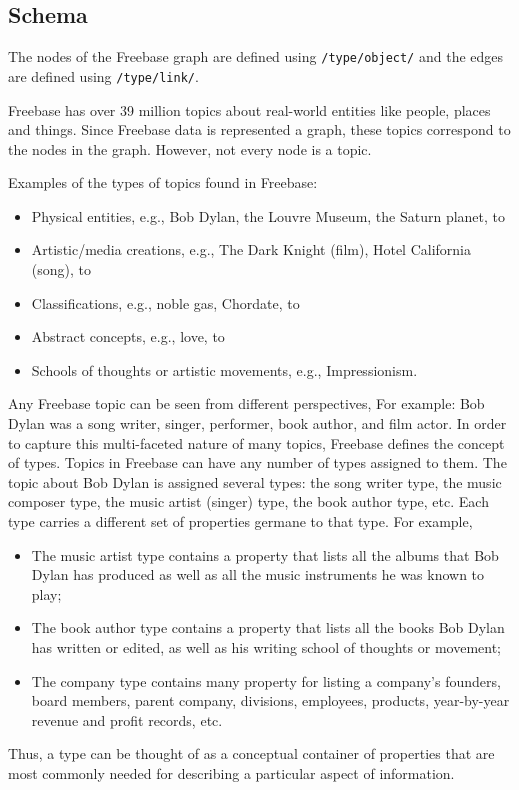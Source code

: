 \documentclass[a4paper, twoside, 12pt]{report}
\begin{document}
\subsection{Schema}

The nodes of the Freebase graph are defined using \texttt{/type/object/} and the edges are defined using \texttt{/type/link/}.

Freebase has over 39 million topics about real-world entities like people, places and things. Since Freebase data is represented a graph, these topics correspond to the nodes in the graph. However, not every node is a topic.

Examples of the types of topics found in Freebase:
\begin{itemize}
  \item Physical entities, e.g., Bob Dylan, the Louvre Museum, the Saturn planet, to
  \item Artistic/media creations, e.g., The Dark Knight (film), Hotel California (song), to
  \item Classifications, e.g., noble gas, Chordate, to
  \item Abstract concepts, e.g., love, to
  \item Schools of thoughts or artistic movements, e.g., Impressionism.
\end{itemize}


Any Freebase topic can be seen from different perspectives, For example: Bob Dylan was a song writer, singer, performer, book author, and film actor. In order to capture this multi-faceted nature of many topics, Freebase defines the concept of types. Topics in Freebase can have any number of types assigned to them. The topic about Bob Dylan is assigned several types: the song writer type, the music composer type, the music artist (singer) type, the book author type, etc. Each type carries a different set of properties germane to that type. For example,
\begin{itemize}
\item The music artist type contains a property that lists all the albums that Bob Dylan has produced as well as all the music instruments he was known to play;
\item The book author type contains a property that lists all the books Bob Dylan has written or edited, as well as his writing school of thoughts or movement;
\item The company type contains many property for listing a company's founders, board members, parent company, divisions, employees, products, year-by-year revenue and profit records, etc.
\end{itemize}
Thus, a type can be thought of as a conceptual container of properties that are most commonly needed for describing a particular aspect of information.
\end{document}
